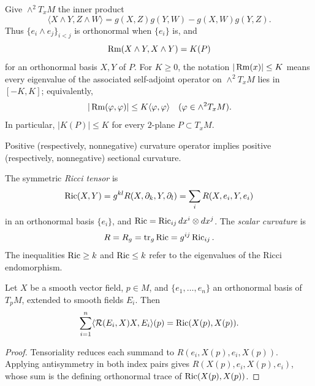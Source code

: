\begin{definition}
\label{def:curvature-operator-norm}





Give $\wedge^2T_xM$ the inner product
\[
  \langle X\wedge Y,Z\wedge W\rangle
  =g(X,Z)g(Y,W)-g(X,W)g(Y,Z).
\]
Thus $\{e_i\wedge e_j\}_{i<j}$ is orthonormal when $\{e_i\}$ is, and
\[
  \operatorname{Rm}(X\wedge Y,X\wedge Y)=K(P)
\]
for an orthonormal basis $X,Y$ of $P$. For $K\ge0$, the notation
$|\operatorname{Rm}(x)|\le K$ means every eigenvalue of the associated self-adjoint
operator on $\wedge^2T_xM$ lies in $[-K,K]$; equivalently,
\[
  |\operatorname{Rm}(\varphi,\varphi)|\le K\langle\varphi,\varphi\rangle
  \quad(\varphi\in\wedge^2T_xM).
\]
In particular, $|K(P)|\le K$ for every $2$-plane $P\subset T_xM$.
\end{definition}

Positive (respectively, nonnegative) curvature operator implies positive
(respectively, nonnegative) sectional curvature.


\begin{definition}
\label{def:ricci-curvature}





The symmetric \emph{Ricci tensor} is
\[
  \operatorname{Ric}(X,Y)=g^{kl}R(X,\partial_k,Y,\partial_l)
  =\sum_iR(X,e_i,Y,e_i)
\]
in an orthonormal basis $\{e_i\}$, and
$\operatorname{Ric}=\operatorname{Ric}_{ij}dx^i\otimes dx^j$. The \emph{scalar curvature} is
\[
  R=R_g=\operatorname{tr}_g\operatorname{Ric}=g^{ij}\operatorname{Ric}_{ij}.
\]
The inequalities $\operatorname{Ric}\ge k$ and $\operatorname{Ric}\le k$ refer to the eigenvalues
of the Ricci endomorphism.
\end{definition}

\begin{lemma}
\label{lem:ricci-trace-curvature-operator}




Let $X$ be a smooth vector field, $p\in M$, and
$\{e_1,\ldots,e_n\}$ an orthonormal basis of $T_pM$, extended to
smooth fields $E_i$. Then
\[
  \sum_{i=1}^n\langle\mathcal R(E_i,X)X,E_i\rangle(p)
  =\operatorname{Ric}(X(p),X(p)).
\]
\end{lemma}

\begin{proof}
\sketch
{}

Tensoriality reduces each summand to
$R(e_i,X(p),e_i,X(p))$. Applying antisymmetry in both index pairs
gives $R(X(p),e_i,X(p),e_i)$, whose sum is the defining orthonormal
trace of $\operatorname{Ric}(X(p),X(p))$.
\end{proof}

